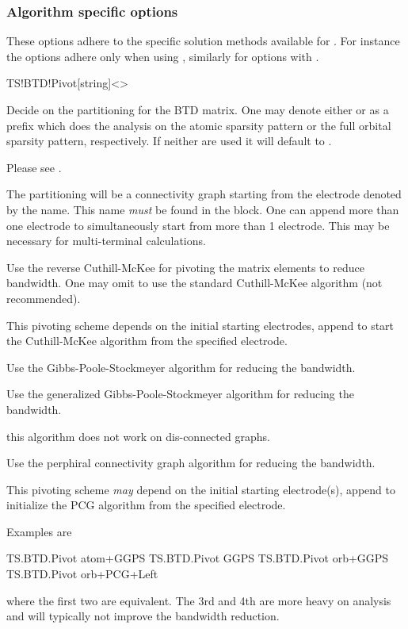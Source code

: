 \subsubsection{Algorithm specific options}

These options adhere to the specific solution methods available for
\tsiesta. For instance the  options adhere only when
using , similarly for options with
.

\begin{fdfentry}{TS!BTD!Pivot}[string]<>

  Decide on the partitioning for the BTD matrix. One may denote either
   or  as a prefix which does the analysis on
  the atomic sparsity pattern or the full orbital sparsity pattern,
  respectively. If neither are used it will default to .

  Please see .

  \begin{fdfoptions}

    The partitioning will be a connectivity graph starting from the
    electrode denoted by the name. This name \emph{must} be found in
    the  block. One can append more than one electrode
    to simultaneously start from more than 1 electrode. This may be
    necessary for multi-terminal calculations.

    \option[rev-CM] %
    Use the reverse Cuthill-McKee for pivoting the matrix elements to
    reduce bandwidth. One may omit  to use the standard
    Cuthill-McKee algorithm (not recommended).

    This pivoting scheme depends on the initial starting
    electrodes, append  to start the Cuthill-McKee
    algorithm from the specified electrode.

    \option[GPS] %
    Use the Gibbs-Poole-Stockmeyer algorithm for reducing the
    bandwidth.

    \option[GGPS] %
    Use the generalized Gibbs-Poole-Stockmeyer algorithm for reducing
    the bandwidth.

    \note this algorithm does not work on dis-connected graphs.

    \option[PCG] %
    Use the perphiral connectivity graph algorithm for reducing the
    bandwidth.

    This pivoting scheme \emph{may} depend on the initial starting
    electrode(s), append  to initialize the PCG
    algorithm from the specified electrode.

  \end{fdfoptions}

  Examples are
  \begin{fdfexample}
    TS.BTD.Pivot atom+GGPS
    TS.BTD.Pivot GGPS
    TS.BTD.Pivot orb+GGPS
    TS.BTD.Pivot orb+PCG+Left
  \end{fdfexample}
  where the first two are equivalent. The 3rd and 4th are more heavy
  on analysis and will typically not improve the bandwidth reduction.
  
\end{fdfentry}

